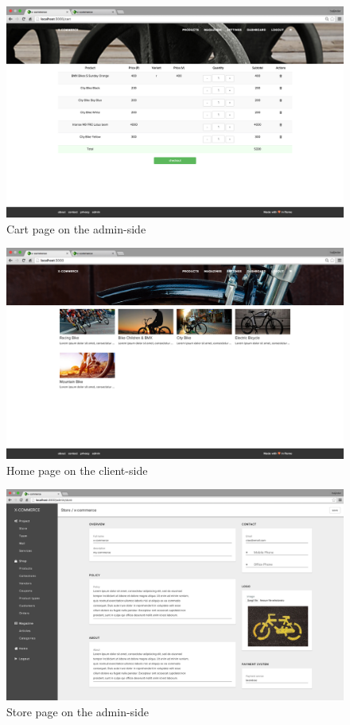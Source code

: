 \begin{figure}[htb]
\centering
\includegraphics[width=1.0\linewidth]{images/chapter4/page-cart.png}\hfill
\caption[Cart page on the admin-side]{Cart page on the admin-side}
\label{fig:page_cart_cli}
\end{figure}
\begin{figure}[htb]
\centering
\includegraphics[width=1.0\linewidth]{images/chapter4/page-collection.png}\hfill
\caption[Home page on the client-side]{Home page on the client-side}
\label{fig:page_home_cli}
\end{figure}
\begin{figure}[htb]
\centering
\includegraphics[width=1.0\linewidth]{images/chapter4/page-store.png}\hfill
\caption[Store page on the admin-side]{Store page on the admin-side}
\label{fig:page_store_admin}
\end{figure}
